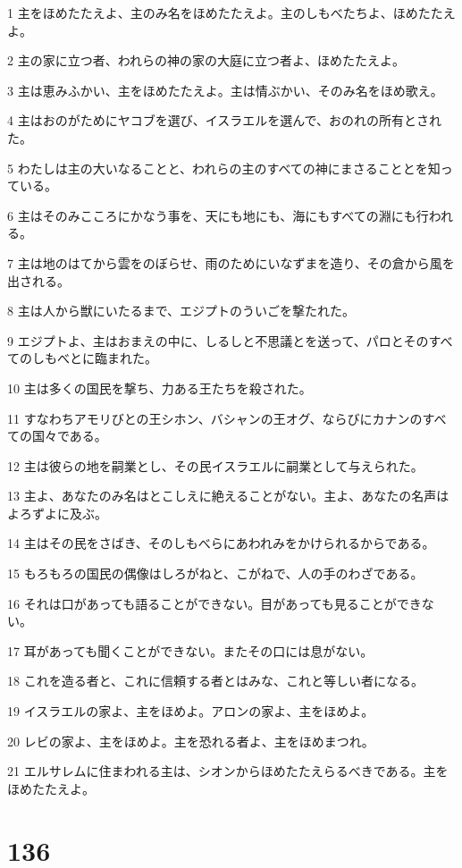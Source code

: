 \par 1 主をほめたたえよ、主のみ名をほめたたえよ。主のしもべたちよ、ほめたたえよ。
\par 2 主の家に立つ者、われらの神の家の大庭に立つ者よ、ほめたたえよ。
\par 3 主は恵みふかい、主をほめたたえよ。主は情ぶかい、そのみ名をほめ歌え。
\par 4 主はおのがためにヤコブを選び、イスラエルを選んで、おのれの所有とされた。
\par 5 わたしは主の大いなることと、われらの主のすべての神にまさることとを知っている。
\par 6 主はそのみこころにかなう事を、天にも地にも、海にもすべての淵にも行われる。
\par 7 主は地のはてから雲をのぼらせ、雨のためにいなずまを造り、その倉から風を出される。
\par 8 主は人から獣にいたるまで、エジプトのういごを撃たれた。
\par 9 エジプトよ、主はおまえの中に、しるしと不思議とを送って、パロとそのすべてのしもべとに臨まれた。
\par 10 主は多くの国民を撃ち、力ある王たちを殺された。
\par 11 すなわちアモリびとの王シホン、バシャンの王オグ、ならびにカナンのすべての国々である。
\par 12 主は彼らの地を嗣業とし、その民イスラエルに嗣業として与えられた。
\par 13 主よ、あなたのみ名はとこしえに絶えることがない。主よ、あなたの名声はよろずよに及ぶ。
\par 14 主はその民をさばき、そのしもべらにあわれみをかけられるからである。
\par 15 もろもろの国民の偶像はしろがねと、こがねで、人の手のわざである。
\par 16 それは口があっても語ることができない。目があっても見ることができない。
\par 17 耳があっても聞くことができない。またその口には息がない。
\par 18 これを造る者と、これに信頼する者とはみな、これと等しい者になる。
\par 19 イスラエルの家よ、主をほめよ。アロンの家よ、主をほめよ。
\par 20 レビの家よ、主をほめよ。主を恐れる者よ、主をほめまつれ。
\par 21 エルサレムに住まわれる主は、シオンからほめたたえらるべきである。主をほめたたえよ。

\chapter{136}

